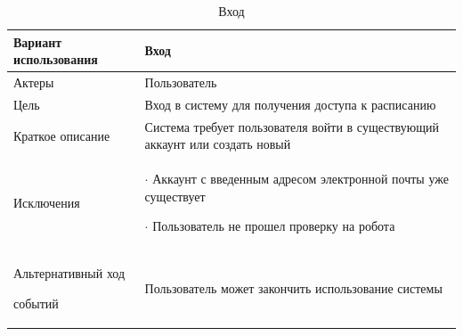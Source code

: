 \documentclass[14pt]{extreport}
\begin{document}
        \begin{table}[H]
        
            \begin{center}
            \caption{Вход \label{table1}}
            \begin{tabular}{|p{5.5cm}|p{10.7cm}|}
            \hline
            Вариант использования & Вход \\
            \hline
            Актеры
             & Пользователь
             \\
            \hline
            Цель
             & Вход в систему для получения доступа к расписанию 
             \\
            \hline
            Краткое описание
             & Система требует пользователя войти в существующий аккаунт или создать новый 
             \\
            \hline
            Исключения
             & 
            $\cdot$ Аккаунт с введенным адресом электронной почты уже существует 
            
            $\cdot$ Пользователь не прошел проверку на робота 
             \\
            \hline
            Альтернативный ход 
            
            событий
            & Пользователь может закончить использование системы \\
            
            \hline
            \end{tabular}
            \end{center}
            \end{table}
        
\end{document}

